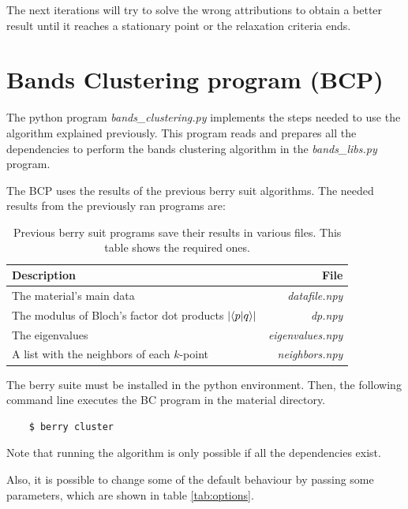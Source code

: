 \documentclass[a4paper,12pt]{report}
\begin{document}
\begin{appendices}
The next iterations will try to solve the wrong attributions to obtain a better result until it reaches a stationary point or the relaxation criteria ends.




\section{Bands Clustering program (BCP)}

The python program \textit{bands\_clustering.py} implements the steps needed to use the algorithm explained previously. This program reads and prepares all the dependencies to perform the bands clustering algorithm in the \textit{bands\_libs.py} program.

The BCP uses the results of the previous berry suit algorithms. The needed results from the previously ran programs are:

\begin{table}[H]
    \center
    \caption{Previous berry suit programs save their results in various files. This table shows the required ones.}
    \begin{tabular}{lr}
        \hline
        Description & File \\
        \hline
        The material's main data & \textit{datafile.npy}\\
        The modulus of Bloch's factor dot products $\left|\braket{p}{q}\right|$ & \textit{dp.npy}\\
        The eigenvalues & \textit{eigenvalues.npy}\\
        A list with the neighbors of each $k$-point & \textit{neighbors.npy}\\

        \hline
    \end{tabular}
\end{table}

The berry suite must be installed in the python environment. Then, the following command line executes the BC program in the material directory.

\begin{verbatim}
    $ berry cluster
\end{verbatim}

Note that running the algorithm is only possible if all the dependencies exist.

Also, it is possible to change some of the default behaviour by passing some parameters, which are shown in table \ref{tab:options}.


\end{appendices}
\end{document}

